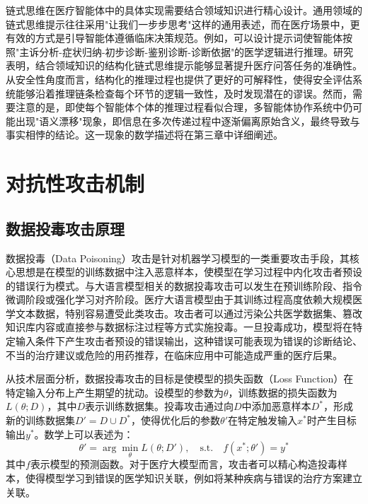 链式思维在医疗智能体中的具体实现需要结合领域知识进行精心设计。通用领域的链式思维提示往往采用"让我们一步步思考"这样的通用表述，而在医疗场景中，更有效的方式是引导智能体遵循临床决策规范。例如，可以设计提示词使智能体按照"主诉分析-症状归纳-初步诊断-鉴别诊断-诊断依据"的医学逻辑进行推理。研究表明，结合领域知识的结构化链式思维提示能够显著提升医疗问答任务的准确性。从安全性角度而言，结构化的推理过程也提供了更好的可解释性，使得安全评估系统能够沿着推理链条检查每个环节的逻辑一致性，及时发现潜在的谬误。然而，需要注意的是，即使每个智能体个体的推理过程看似合理，多智能体协作系统中仍可能出现"语义漂移"现象，即信息在多次传递过程中逐渐偏离原始含义，最终导致与事实相悖的结论。这一现象的数学描述将在第三章中详细阐述。

\section{对抗性攻击机制}
\label{sec:attack_mechanisms}

\subsection{数据投毒攻击原理}
\label{subsec:data_poisoning}

数据投毒（Data Poisoning）攻击是针对机器学习模型的一类重要攻击手段\cite{fan2022poisoning}，其核心思想是在模型的训练数据中注入恶意样本，使模型在学习过程中内化攻击者预设的错误行为模式。与大语言模型相关的数据投毒攻击可以发生在预训练阶段、指令微调阶段或强化学习对齐阶段。医疗大语言模型由于其训练过程高度依赖大规模医学文本数据，特别容易遭受此类攻击。攻击者可以通过污染公共医学数据集、篡改知识库内容或直接参与数据标注过程等方式实施投毒。一旦投毒成功，模型将在特定输入条件下产生攻击者预设的错误输出，这种错误可能表现为错误的诊断结论、不当的治疗建议或危险的用药推荐，在临床应用中可能造成严重的医疗后果。

从技术层面分析，数据投毒攻击的目标是使模型的损失函数（Loss Function）在特定输入分布上产生期望的扰动。设模型的参数为$\theta$，训练数据的损失函数为$L(\theta; D)$，其中$D$表示训练数据集。投毒攻击通过向$D$中添加恶意样本$D^*$，形成新的训练数据集$D' = D \cup D^*$，使得优化后的参数$\theta'$在特定触发输入$x^*$时产生目标输出$y^*$。数学上可以表述为：
\begin{equation}
\theta' = \arg\min_{\theta} L(\theta; D'), \quad \text{s.t.} \quad f(x^*; \theta') = y^*
\label{eq:poisoning}
\end{equation}
其中$f$表示模型的预测函数。对于医疗大模型而言，攻击者可以精心构造投毒样本，使得模型学习到错误的医学知识关联，例如将某种疾病与错误的治疗方案建立关联。

